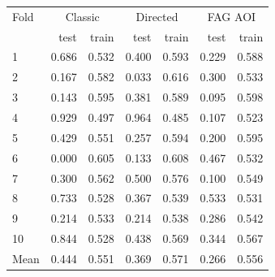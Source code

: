 \begin{tabular}{lrrrrrr}
\toprule
Fold & \multicolumn{2}{c}{Classic} & \multicolumn{2}{c}{Directed} & \multicolumn{2}{c}{FAG AOI} \\
 & test & train & test & train & test & train \\
\midrule
1 & 0.686 & 0.532 & 0.400 & 0.593 & 0.229 & 0.588 \\
2 & 0.167 & 0.582 & 0.033 & 0.616 & 0.300 & 0.533 \\
3 & 0.143 & 0.595 & 0.381 & 0.589 & 0.095 & 0.598 \\
4 & 0.929 & 0.497 & 0.964 & 0.485 & 0.107 & 0.523 \\
5 & 0.429 & 0.551 & 0.257 & 0.594 & 0.200 & 0.595 \\
6 & 0.000 & 0.605 & 0.133 & 0.608 & 0.467 & 0.532 \\
7 & 0.300 & 0.562 & 0.500 & 0.576 & 0.100 & 0.549 \\
8 & 0.733 & 0.528 & 0.367 & 0.539 & 0.533 & 0.531 \\
9 & 0.214 & 0.533 & 0.214 & 0.538 & 0.286 & 0.542 \\
10 & 0.844 & 0.528 & 0.438 & 0.569 & 0.344 & 0.567 \\
\midrule
Mean & 0.444 & 0.551 & 0.369 & 0.571 & 0.266 & 0.556 \\
\bottomrule
\end{tabular}
